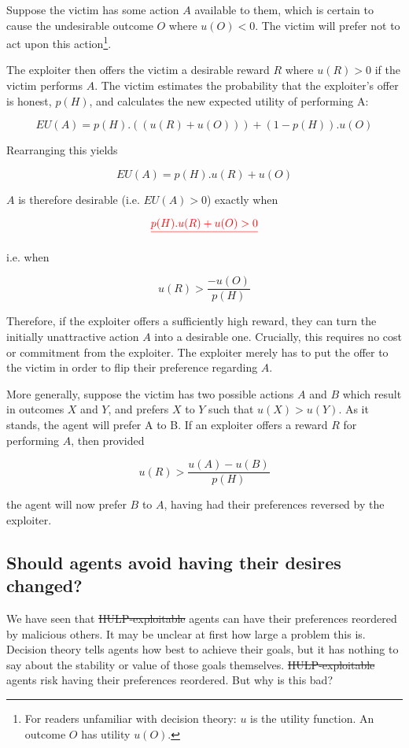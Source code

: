 \documentclass{article}
\providecommand{\DIFadd}[1]{{\protect\color{blue}\uwave{#1}}} %
\providecommand{\DIFdel}[1]{{\protect\color{red}\sout{#1}}}                      %
\providecommand{\DIFaddbegin}{} %
\providecommand{\DIFaddend}{} %
\providecommand{\DIFdelbegin}{} %
\providecommand{\DIFdelend}{} %
\begin{document}
Suppose the victim has some action \(A\) available to them, which is certain to cause the undesirable outcome \(O\) where \(u(O) < 0\). The victim will prefer not to act upon this action\footnote{For readers unfamiliar with decision theory: \(u\) is the utility function. An outcome \(O\) has utility \(u(O)\).}.

The exploiter then offers the victim a desirable reward \(R\) where \(u(R) > 0\) if the victim performs \(A\). The victim estimates the probability that the exploiter's offer is honest, \(p(H)\), and calculates the new expected utility of performing A:

\[EU(A) = p(H).((u(R)+u(O))) + (1-p(H)).u(O)\]

Rearranging this yields

\[EU(A) = p(H).u(R) + u(O)\]

\(A\) is therefore desirable (i.e. \(EU(A)>0\)) exactly when \DIFdelbegin %

\[\DIFdel{p(H).u(R) + u(O) > 0}\]

\DIFdelend \DIFaddbegin \DIFadd{\(p(H).u(R) + u(O) > 0\) }\DIFaddend i.e. when

\[u(R) > \frac{-u(O)}{p(H)}\]

Therefore, if the exploiter offers a sufficiently high reward, they can turn the initially unattractive action \(A\) into a desirable one. Crucially, this requires no cost or commitment from the exploiter. The exploiter merely has to put the offer to the victim in order to flip their preference regarding \(A\).

More generally, suppose the victim has two possible actions \(A\) and \(B\) which result in outcomes \(X\) and \(Y\), and prefers \(X\) to \(Y\) such that \(u(X)>u(Y)\). As it stands, the agent will prefer A to B. If an exploiter offers a reward \(R\) for performing \(A\), then provided

\[u(R) > \frac{u(A)-u(B)}{p(H)}\]

the agent will now prefer \(B\) to \(A\), having had their preferences reversed by the exploiter.

\subsection{Should agents avoid having their desires changed?}

We have seen that \DIFdelbegin \DIFdel{HULP-exploitable }\DIFdelend \DIFaddbegin \DIFadd{HULP exploitable }\DIFaddend agents can have their preferences reordered by malicious others. It may be unclear at first how large a problem this is. Decision theory tells agents how best to achieve their goals, but it has nothing to say about the stability or value of those goals themselves. \DIFdelbegin \DIFdel{HULP-exploitable }\DIFdelend \DIFaddbegin \DIFadd{HULP exploitable }\DIFaddend agents risk having their preferences reordered. But why is this bad?
\end{document}
